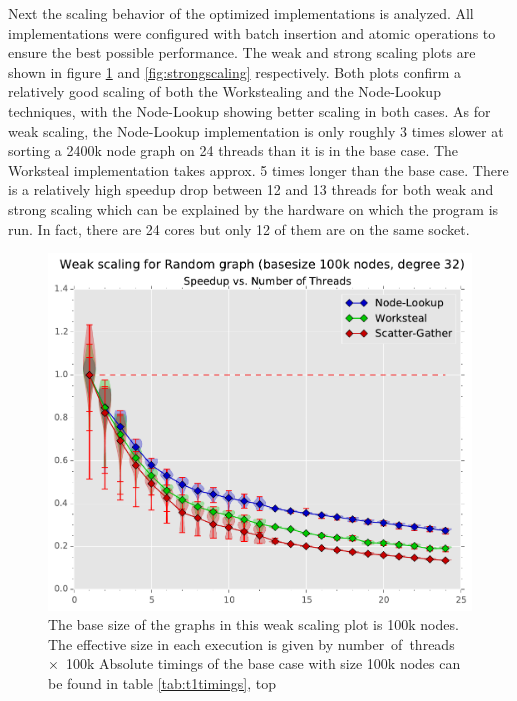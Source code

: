 Next the scaling behavior of the optimized implementations is analyzed. All implementations were configured with batch insertion and atomic operations to ensure the best possible performance.
The weak and strong scaling plots are shown in figure \ref{fig:weakscaling} and \ref{fig:strongscaling} respectively.
Both plots confirm a relatively good scaling of both the Workstealing and the Node-Lookup techniques, with the Node-Lookup showing better scaling in both cases.
As for weak scaling, the Node-Lookup implementation is only roughly 3 times slower at sorting a 2400k node graph on 24 threads than it is in the base case. The Worksteal implementation takes approx. 5 times longer than the base case.
There is a relatively high speedup drop between 12 and 13 threads for both weak and strong scaling which can be explained by the hardware on which the program is run. In fact, there are 24 cores but only 12 of them are on the same socket.
%
\begin{figure}[t]
	\centering
	\includegraphics[width=\columnwidth]{plots/weakscaling_gtRANDOMLIN32_n1000000_deg32.pdf}
	\caption{The base size of the graphs in this weak scaling plot is 100k nodes. The effective size in each execution is given by number~of~threads~$\times$~100k
	Absolute timings of the base case with size 100k nodes can be found in table \ref{tab:t1timings}, top
}
	\label{fig:weakscaling}
\end{figure}
%
